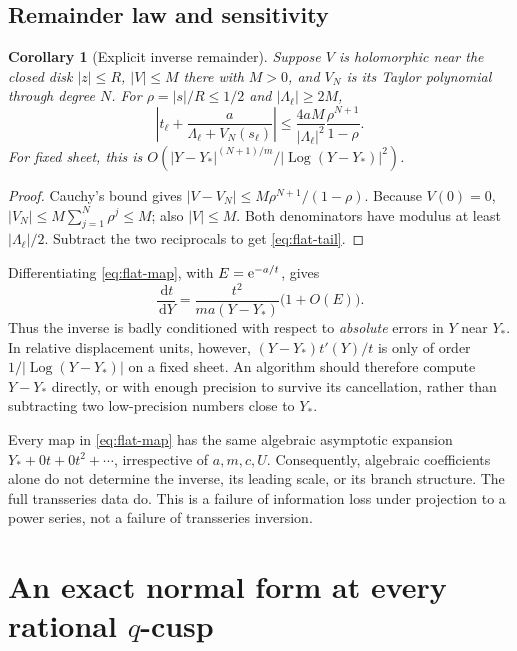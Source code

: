 \documentclass[11pt,a4paper]{article}
\numberwithin{equation}{section}
\newtheorem{corollary}[theorem]{Corollary}
\theoremstyle{definition}\newtheorem{definition}[theorem]{Definition}
\theoremstyle{remark}\newtheorem{remark}[theorem]{Remark}
\newcommand{\Log}{\operatorname{Log}}\newcommand{\Li}{\operatorname{Li}}
\newcommand{\dd}{\,\mathrm d}\newcommand{\eps}{\varepsilon}
\begin{document}
\subsection{Remainder law and sensitivity}
\begin{corollary}[Explicit inverse remainder]\label{cor:flat-tail}
Suppose $V$ is holomorphic near the closed disk $|z|\le R$,
$|V|\le M$ there with $M>0$, and $V_N$ is its Taylor polynomial through degree $N$.
For $\rho=|s|/R\le1/2$ and $|\Lambda_\ell|\ge2M$,
\begin{equation}\label{eq:flat-tail}
 \left|t_\ell+\frac{a}{\Lambda_\ell+V_N(s_\ell)}\right|
 \le \frac{4aM}{|\Lambda_\ell|^2}
 \frac{\rho^{N+1}}{1-\rho}.
\end{equation}
For fixed sheet, this is
$O(|Y-Y_*|^{(N+1)/m}/|\Log(Y-Y_*)|^2)$.
\end{corollary}
\begin{proof}
Cauchy's bound gives
$|V-V_N|\le M\rho^{N+1}/(1-\rho)$.
Because $V(0)=0$, $|V_N|\le M\sum_{j=1}^N\rho^j\le M$;
also $|V|\le M$. Both denominators have modulus at least
$|\Lambda_\ell|/2$. Subtract the two reciprocals to get
\eqref{eq:flat-tail}.
\end{proof}

Differentiating \eqref{eq:flat-map}, with $E=\mathrm e^{-a/t}$, gives
\begin{equation}\label{eq:flat-sensitivity}
 \frac{\dd t}{\dd Y}
 =\frac{t^2}{ma(Y-Y_*)}\bigl(1+O(E)\bigr).
\end{equation}
Thus the inverse is badly conditioned with respect to \emph{absolute}
errors in $Y$ near $Y_*$. In relative displacement units, however,
$(Y-Y_*)t'(Y)/t$ is only of order $1/|\Log(Y-Y_*)|$ on a fixed sheet.
An algorithm should therefore compute $Y-Y_*$ directly, or with enough
precision to survive its cancellation, rather than subtracting two
low-precision numbers close to $Y_*$.

Every map in \eqref{eq:flat-map} has the same algebraic asymptotic
expansion $Y_*+0t+0t^2+\cdots$, irrespective of $a,m,c,U$.
Consequently, algebraic coefficients alone do not determine the inverse,
its leading scale, or its branch structure. The full transseries data do.
This is a failure of information loss under projection to a power series,
not a failure of transseries inversion.

\section{An exact normal form at every rational \texorpdfstring{$q$}{q}-cusp}
\label{sec:cusps}
\end{document}
